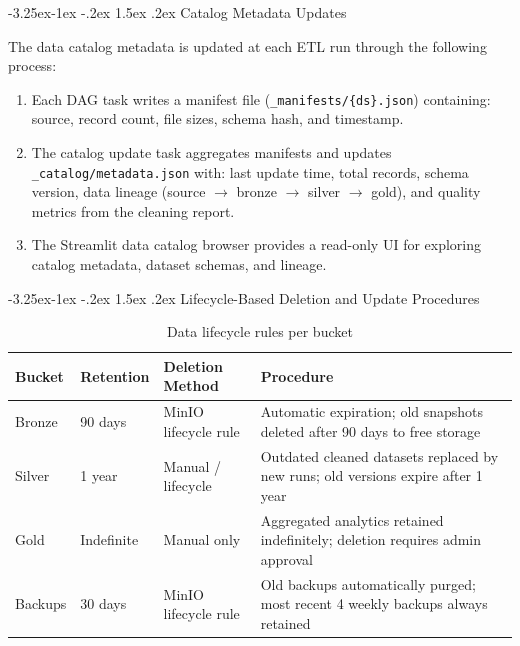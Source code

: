 \documentclass[a4paper,11pt,oneside,openany]{report}
\makeatletter
\renewcommand\subsection{\@startsection{subsection}{2}{\z@}%
  {-3.25ex\@plus -1ex \@minus -.2ex}%
  {1.5ex \@plus .2ex}%
  {\normalfont\large\bfseries\color{ntdarkgreen}}}
\makeatother
\begin{document}
\subsection{Catalog Metadata Updates}

The data catalog metadata is updated at each ETL run through the following process:
\begin{enumerate}[nosep]
  \item Each DAG task writes a manifest file (\texttt{\_manifests/\{ds\}.json})
        containing: source, record count, file sizes, schema hash, and timestamp.
  \item The catalog update task aggregates manifests and updates
        \texttt{\_catalog/metadata.json} with: last update time, total records,
        schema version, data lineage (source $\to$ bronze $\to$ silver $\to$ gold),
        and quality metrics from the cleaning report.
  \item The Streamlit data catalog browser provides a read-only UI for exploring
        catalog metadata, dataset schemas, and lineage.
\end{enumerate}

\subsection{Lifecycle-Based Deletion and Update Procedures}

\begin{table}[H]
\centering
\caption{Data lifecycle rules per bucket}
\label{tab:lifecycle}
\begin{tabularx}{\textwidth}{L{2cm} L{2cm} L{3cm} L{5.5cm}}
\toprule
\textbf{Bucket} & \textbf{Retention} & \textbf{Deletion Method} & \textbf{Procedure} \\
\midrule
Bronze & 90 days & MinIO lifecycle rule & Automatic expiration; old snapshots deleted after 90 days to free storage \\
Silver & 1 year & Manual / lifecycle & Outdated cleaned datasets replaced by new runs; old versions expire after 1 year \\
Gold & Indefinite & Manual only & Aggregated analytics retained indefinitely; deletion requires admin approval \\
Backups & 30 days & MinIO lifecycle rule & Old backups automatically purged; most recent 4 weekly backups always retained \\
\bottomrule
\end{tabularx}
\end{table}
\end{document}
